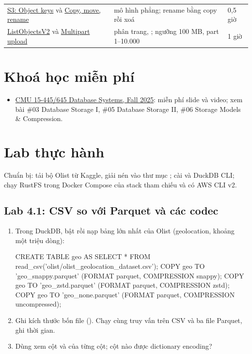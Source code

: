 \begin{xltabular}{\textwidth}{@{}P{4.2cm} L P{1.8cm}@{}}
\href{https://docs.aws.amazon.com/AmazonS3/latest/userguide/object-keys.html}{S3: Object keys} và \href{https://docs.aws.amazon.com/AmazonS3/latest/userguide/copy-object.html}{Copy, move, rename} & mô hình phẳng; rename bằng copy rồi xoá & 0,5 giờ \\
\href{https://docs.aws.amazon.com/AmazonS3/latest/API/API_ListObjectsV2.html}{ListObjectsV2} và \href{https://docs.aws.amazon.com/AmazonS3/latest/userguide/mpuoverview.html}{Multipart upload} & phân trang, ; ngưỡng 100 MB, part 1--10.000 & 1 giờ \\
\end{xltabular}

\section{Khoá học miễn phí}
\begin{itemize}
  \item \href{https://15445.courses.cs.cmu.edu/fall2025/schedule.html}{CMU 15-445/645 Database Systems, Fall 2025}: miễn phí slide và video; xem bài \#03 Database Storage I, \#05 Database Storage II, \#06 Storage Models \& Compression.
\end{itemize}

\section{Lab thực hành}
Chuẩn bị: tải bộ Olist từ Kaggle, giải nén vào thư mục ; cài  và DuckDB CLI; chạy RustFS trong Docker Compose của stack tham chiếu và có AWS CLI v2.

\subsection{Lab 4.1: CSV so với Parquet và các codec}
\begin{enumerate}
  \item Trong DuckDB, bật  rồi nạp bảng lớn nhất của Olist (geolocation, khoảng một triệu dòng):
\begin{codeblock}
CREATE TABLE geo AS SELECT * FROM read_csv('olist/olist_geolocation_dataset.csv');
COPY geo TO 'geo_snappy.parquet' (FORMAT parquet, COMPRESSION snappy);
COPY geo TO 'geo_zstd.parquet'   (FORMAT parquet, COMPRESSION zstd);
COPY geo TO 'geo_none.parquet'   (FORMAT parquet, COMPRESSION uncompressed);
\end{codeblock}
  \item Ghi kích thước bốn file (). Chạy cùng truy vấn  trên CSV và ba file Parquet, ghi thời gian.
  \item Dùng  xem cột  và  của từng cột; cột nào được dictionary encoding?
\end{enumerate}

